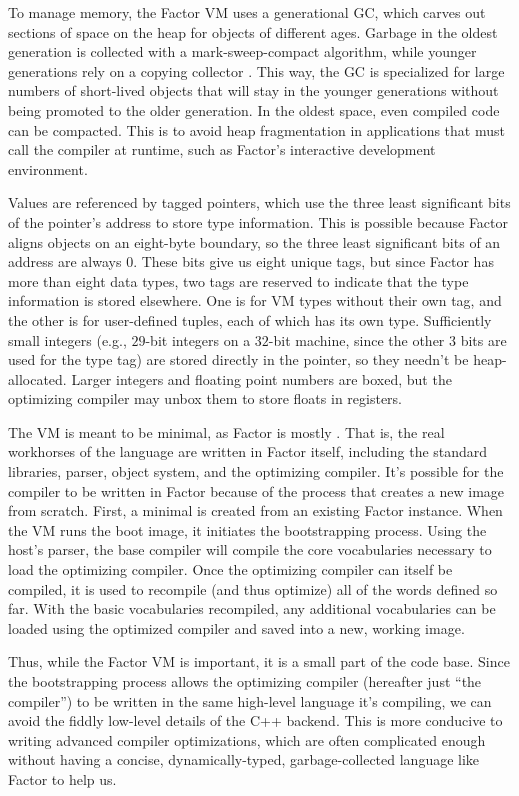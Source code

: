 To manage memory, the Factor \gls{VM} uses a generational \gls{GC}, which
carves out sections of space on the heap for objects of different ages.
Garbage in the oldest generation is collected with a mark-sweep-compact
algorithm, while younger generations rely on a copying collector
\autocite{GGC}.  This way, the \gls{GC} is specialized for large numbers of
short-lived objects that will stay in the younger generations without being
promoted to the older generation.  In the oldest space, even compiled code can
be compacted.  This is to avoid heap fragmentation in applications that must
call the compiler at runtime, such as Factor's interactive development
environment.

Values are referenced by tagged pointers, which use the three least significant
bits of the pointer's address to store type information.  This is possible
because Factor aligns objects on an eight-byte boundary, so the three least
significant bits of an address are always $0$.  These bits give us eight unique
tags, but since Factor has more than eight data types, two tags are reserved to
indicate that the type information is stored elsewhere.  One is for \gls{VM}
types without their own tag, and the other is for user-defined tuples, each of
which has its own type.  Sufficiently small integers (e.g., $29$-bit integers
on a $32$-bit machine, since the other $3$ bits are used for the type tag) are
stored directly in the pointer, so they needn't be heap-allocated.  Larger
integers and floating point numbers are boxed, but the optimizing compiler may
unbox them to store floats in registers.

The \gls{VM} is meant to be minimal, as Factor is mostly .
That is, the real workhorses of the language are written in Factor itself,
including the standard libraries, parser, object system, and the optimizing
compiler.  It's possible for the compiler to be written in Factor because of
the  process that creates a new image from scratch.  First,
a minimal  is created from an existing  Factor
instance.  When the \gls{VM} runs the boot image, it initiates the
bootstrapping process.  Using the host's parser, the base compiler will compile
the core vocabularies necessary to load the optimizing compiler.  Once the
optimizing compiler can itself be compiled, it is used to recompile (and thus
optimize) all of the words defined so far.  With the basic vocabularies
recompiled, any additional vocabularies can be loaded using the optimized
compiler and saved into a new, working image.

Thus, while the Factor \gls{VM} is important, it is a small part of the code
base.  Since the bootstrapping process allows the optimizing compiler
(hereafter just ``the compiler'') to be written in the same high-level language
it's compiling, we can avoid the fiddly low-level details of the C++ backend.
This is more conducive to writing advanced compiler optimizations, which are
often complicated enough without having a concise, dynamically-typed,
garbage-collected language like Factor to help us.
